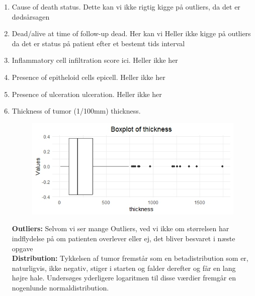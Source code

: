 \begin{enumerate}
\item Cause of death status. \newline
Dette kan vi ikke rigtig kigge på outliers, da det er dødsårsagen 
\item Dead/alive at time of follow-up dead. \newline
Her kan vi Heller ikke kigge på outliers da det er status på patient efter et bestemt tids interval
\item Inflammatory cell infiltration score ici. \newline
Heller ikke her
\item Presence of epitheloid cells epicell. \newline
Heller ikke her
\item Presence of ulceration ulceration. \newline
Heller ikke her
\item Thickness of tumor (1/100mm) thickness.\\
\begin{figure}
    \centering
    \includegraphics[width=0.5\linewidth]{Project/BIlleder_Duration/Thickness_Outliers.jpeg}
\end{figure}
\textbf{Outliers: }Selvom vi ser mange Outliers, ved vi ikke om størrelsen har indflydelse på om patienten overlever eller ej, det bliver besvaret i næste opgave\\
\textbf{Distribution: } Tykkelsen af tumor fremstår som en betadistribution som er, naturligvis, ikke negativ, stiger i starten og falder derefter og får en lang højre hale. Undersøges yderligere logaritmen til disse værdier fremgår en nogenlunde normaldistribution.\\


\end{enumerate}
